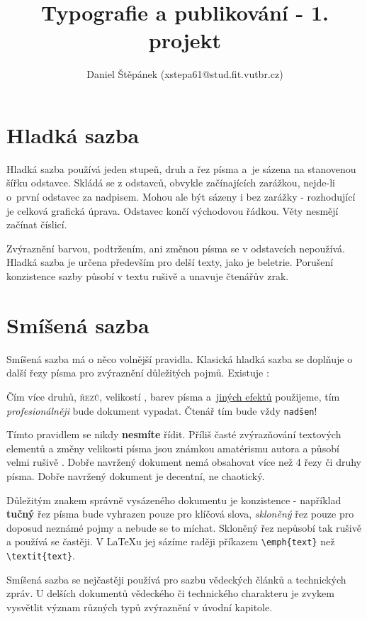 \documentclass[a4paper, twocolumn]{article}
\title{Typografie a publikování - 1. projekt \\[5mm]}
\author{Daniel Štěpánek (xstepa61@stud.fit.vutbr.cz)}
\date{}
\begin{document}
\maketitle

\section{Hladká sazba}

Hladká sazba používá jeden stupeň, druh a řez písma a~je sázena na stanovenou šířku odstavce. Skládá se z odstavců, obvykle začínajících zarážkou, nejde-li o~první odstavec za nadpisem. Mohou ale být sázeny i bez zarážky - rozhodující je celková grafická úprava. Odstavec končí východovou řádkou. Věty nesmějí začínat číslicí.

Zvýraznění barvou, podtržením, ani změnou písma se v odstavcích nepoužívá. Hladká sazba je určena především pro delší texty, jako je beletrie. Porušení konzistence sazby působí v textu rušivě a unavuje čtenářův zrak.

\section{Smíšená sazba}
Smíšená sazba má o něco volnější pravidla. Klasická hladká sazba se doplňuje o další řezy písma pro zvýraznění důležitých pojmů. Existuje :

\begin{center}
Čím více druhů, \textsc{řezů}, \tiny velikostí \normalsize , barev písma a~\underline{jiných efektů} použijeme, tím \emph{profesionálněji} bude dokument vypadat. Čtenář tím bude vždy \texttt{\large nadšen}!
\end{center}

Tímto pravidlem se nikdy \textbf{nesmíte} řídit. Příliš časté zvýrazňování textových elementů a změny velikosti \Large{písma} \small jsou známkou amatérismu autora a působí \Huge{velmi} \normalsize rušivě . Dobře navržený dokument nemá obsahovat více než
4 řezy či druhy písma. Dobře navržený dokument je decentní, ne chaotický.

Důležitým znakem správně vysázeného dokumentu je konzistence - například \textbf{tučný} řez písma bude vyhrazen pouze pro klíčová slova, \emph{skloněný} řez pouze pro doposud neznámé pojmy a nebude se to míchat. Skloněný řez nepůsobí tak rušivě a používá se častěji. V \LaTeX u jej sázíme raději příkazem \verb|\emph{text}| než \verb|\textit{text}|.

Smíšená sazba se nejčastěji používá pro sazbu vědeckých článků a technických zpráv. U delších dokumentů vědeckého či technického charakteru je zvykem vysvětlit význam různých typů zvýraznění v úvodní kapitole.
\end{document}
